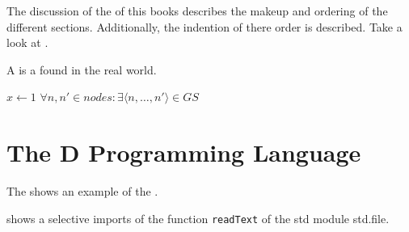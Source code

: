 \documentclass[crop=false,class=scrbook]{standalone}
\begin{document}
The discussion of the  of this books describes the makeup and ordering
of the different sections.
Additionally, the indention of there order is described.
Take a look at .

\begin{defn}
	A  is a  found in the real world.
\end{defn}

\begin{algorithm}
\begin{algorithmic}
   \State \(x \leftarrow 1\)
   \Return \(\forall n,n' \in nodes : \exists \langle n, \dots, n' \rangle \in GS\)
\EndProcedure
\end{algorithmic}
\end{algorithm}

\section{The D Programming Language}

The  shows an example of the .

 shows a selective imports of the function
\texttt{readText} of the std module std.file.
\end{document}

